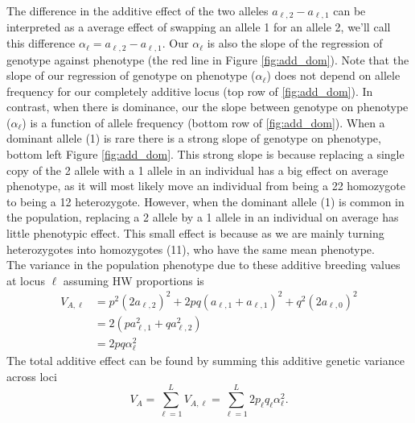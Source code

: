 The difference in the additive effect of the two alleles $a_{\ell, 2}-a_{\ell,
1}$ can be interpreted as a average effect of swapping an allele 1 for an
allele 2, we'll call this difference $\alpha_{\ell}=a_{\ell, 2}-a_{\ell, 1}$.
Our $\alpha_{\ell}$ is also the slope of the regression of genotype against
phenotype (the red line in Figure \ref{fig:add_dom}). Note that the slope of
our regression of genotype on phenotype ($\alpha_{\ell}$) does not depend on
allele frequency for our completely additive locus (top row of
\ref{fig:add_dom}). In contrast, when there is dominance, our the slope between
genotype on phenotype ($\alpha_{\ell}$) is a function of allele frequency
(bottom row of \ref{fig:add_dom}). When a dominant allele (1) is rare there is
a strong slope of genotype on phenotype, bottom left Figure \ref{fig:add_dom}.
This strong slope is because replacing a single copy of the 2 allele with a 1
allele in an individual has a big effect on average phenotype, as it will most
likely move an individual from being a 22 homozygote to being a 12
heterozygote. However, when the dominant allele (1) is common in the
population, replacing a 2 allele by a 1 allele in an individual on average has
little phenotypic effect. This small effect is because as we are mainly turning
heterozygotes into homozygotes (11), who have the same mean phenotype.  \\

The variance in the population phenotype due to these
additive breeding values at locus $\ell$ assuming HW proportions is
\begin{align}
V_{A, \ell} &= p^2 (2a_{\ell,2})^2 + 2pq (a_{\ell,1}+a_{\ell,1})^2 + q^2
(2a_{\ell,0})^2 \nonumber \\
& = 2(p a_{\ell, 1}^2 + q a_{\ell, 2}^2 ) \nonumber \\
& = 2pq \alpha_{\ell}^2
\end{align}
The total additive effect can
be found by summing this additive genetic variance across loci
\begin{equation}
V_A = \sum_{\ell=1}^{L} V_{A, \ell} = \sum_{\ell=1}^{L}
2p_{\ell}q_{\ell} \alpha_{\ell}^2.
\end{equation}


